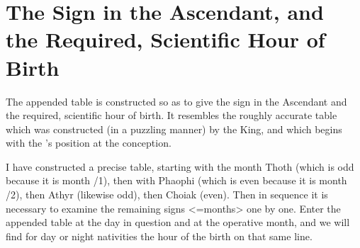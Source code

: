 \section{The Sign in the Ascendant, and the Required, Scientific Hour of Birth}

The appended table is constructed so as to give the sign in the Ascendant and the required, scientific hour of birth. It resembles the roughly accurate table which was constructed (in a puzzling manner) by the King, and which begins with the \Sun’s position at the conception. 

I have constructed a precise table, starting with the month Thoth (which is odd because it is month /1), then with Phaophi (which is even because it is month /2), then Athyr (likewise odd), then Choiak (even). Then in sequence it is necessary to examine the remaining signs <=months> one by one. Enter the appended table at the day in question and at the operative month, and we will find for day or night nativities the hour of the birth on that same line.

\newpage